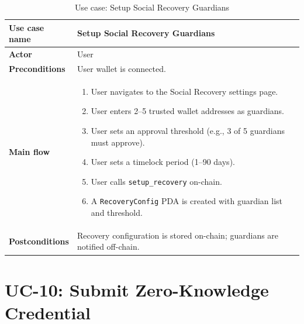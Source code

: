 \begin{table}[H]
\centering
\caption{Use case: Setup Social Recovery Guardians}
\begin{tabular}{|l|p{10cm}|}
\hline
\textbf{Use case name} & Setup Social Recovery Guardians \\ \hline
\textbf{Actor} & User \\ \hline
\textbf{Preconditions} & User wallet is connected. \\ \hline
\textbf{Main flow} & \begin{enumerate}[noitemsep]
    \item User navigates to the Social Recovery settings page.
    \item User enters 2--5 trusted wallet addresses as guardians.
    \item User sets an approval threshold (e.g., 3 of 5 guardians must approve).
    \item User sets a timelock period (1--90 days).
    \item User calls \texttt{setup\_recovery} on-chain.
    \item A \texttt{RecoveryConfig} PDA is created with guardian list and threshold.
\end{enumerate} \\ \hline
\textbf{Postconditions} & Recovery configuration is stored on-chain; guardians are notified off-chain. \\ \hline
\end{tabular}
\end{table}

\section*{UC-10: Submit Zero-Knowledge Credential}


